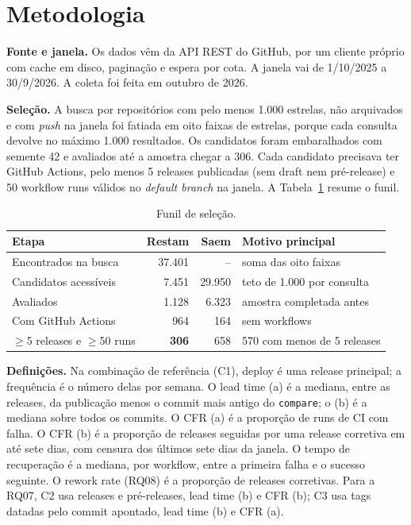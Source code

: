\documentclass[12pt]{article}
\begin{document}
\section{Metodologia}

\textbf{Fonte e janela.} Os dados vêm da API REST do GitHub, por um cliente
próprio com cache em disco, paginação e espera por cota. A janela vai de
1/10/2025 a 30/9/2026. A coleta foi feita em outubro de 2026.

\textbf{Seleção.} A busca por repositórios com pelo menos 1.000 estrelas, não
arquivados e com \emph{push} na janela foi fatiada em oito faixas de estrelas,
porque cada consulta devolve no máximo 1.000 resultados. Os candidatos foram
embaralhados com semente 42 e avaliados até a amostra chegar a 306. Cada
candidato precisava ter GitHub Actions, pelo menos 5 releases publicadas (sem
draft nem pré-release) e 50 workflow runs válidos no \emph{default branch} na
janela. A Tabela~\ref{tab:funil} resume o funil.

\begin{table}[ht]
\centering
\caption{Funil de seleção.}\label{tab:funil}
\small
\begin{tabular}{lrrl}
\toprule
Etapa & Restam & Saem & Motivo principal \\
\midrule
Encontrados na busca & 37.401 & -- & soma das oito faixas \\
Candidatos acessíveis & 7.451 & 29.950 & teto de 1.000 por consulta \\
Avaliados & 1.128 & 6.323 & amostra completada antes \\
Com GitHub Actions & 964 & 164 & sem workflows \\
$\geq$5 releases e $\geq$50 runs & \textbf{306} & 658 & 570 com menos de 5 releases \\
\bottomrule
\end{tabular}
\end{table}

\textbf{Definições.} Na combinação de referência (C1), deploy é uma release
principal; a frequência é o número delas por semana. O lead time (a) é a
mediana, entre as releases, da publicação menos o commit mais antigo do
\texttt{compare}; o (b) é a mediana sobre todos os commits. O CFR (a) é a
proporção de runs de CI com falha. O CFR (b) é a proporção de releases
seguidas por uma release corretiva em até sete dias, com censura dos últimos
sete dias da janela. O tempo de recuperação é a mediana, por workflow, entre
a primeira falha e o sucesso seguinte. O rework rate (RQ08) é a proporção de
releases corretivas. Para a RQ07, C2 usa releases e pré-releases, lead time
(b) e CFR (b); C3 usa tags datadas pelo commit apontado, lead time (b) e
CFR (a).
\end{document}
